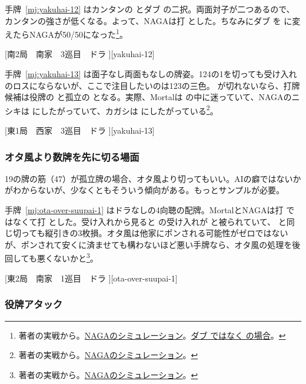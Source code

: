 \documentclass[../nankiru_main.tex]{subfiles}
\begin{document}
手牌~\ref{mj:yakuhai-12} はカンタンの  とダブ  の二択。両面対子が二つあるので、カンタンの強さが低くなる。よって、NAGAは打  とした。ちなみにダブ  を  に変えたらNAGAが50/50になった\footnote{著者の実戦から。\href{https://naga.dmv.nico/htmls/b1ce439d70b8dfc48152e539f75e29d57763308a9de1dfafc95f65a9529f2757v2_2.html?tw=2}{NAGAのシミュレーション}。\href{https://naga.dmv.nico/htmls/af150475d0e819f2f3ef9517b0008a6d4539d560b39615e4786de788c87c4aeav2_2.html?tw=2}{ダブ  ではなく  の場合}。}。

[南2局　南家　3巡目　ドラ ][yakuhai-12]

手牌~\ref{mj:yakuhai-13} は面子なし両面もなしの牌姿。124の1を切っても受け入れのロスにならないが、ここで注目したいのは123の三色。 が切れないなら、打牌候補は役牌の  と孤立の  となる。実際、Mortalは  の中に迷っていて、NAGAのニシキは  にしたがっていて、カガシは  にしたがっている\footnote{著者の実戦から。\href{https://naga.dmv.nico/htmls/d74ee2fcc180f30ce1bccb109223ac1827c57371d858de5d304b683696beabcfv2_2.html?tw=2}{NAGAのシミュレーション}。}。

[東1局　西家　3巡目　ドラ ][yakuhai-13]


\subsubsection*{オタ風より数牌を先に切る場面}

19の牌の筋（47）が孤立牌の場合、オタ風より切ってもいい。AIの癖ではないかがわからないが、少なくともそういう傾向がある。もっとサンプルが必要。

手牌~\ref{mj:ota-over-suupai-1} はドラなしの4向聴の配牌。MortalとNAGAは打  ではなくて打  とした。受け入れから見ると  の受け入れが  と被られていて、 と同じ切っても縦引きの3枚損。オタ風は他家にポンされる可能性がゼロではないが、ポンされて安くに済ませても構わないほど悪い手牌なら、オタ風の処理を後回しても悪くないかと\footnote{著者の実戦から。\href{https://naga.dmv.nico/htmls/5cf8b09858eeb46bf58f9b8facf3d22bef7ac1a019f837024cfc8ce7e6c1c90cv2_2.html?tw=2}{NAGAのシミュレーション}。}。

[東2局　南家　1巡目　ドラ ][ota-over-suupai-1]


\subsubsection*{役牌アタック}
\end{document}
